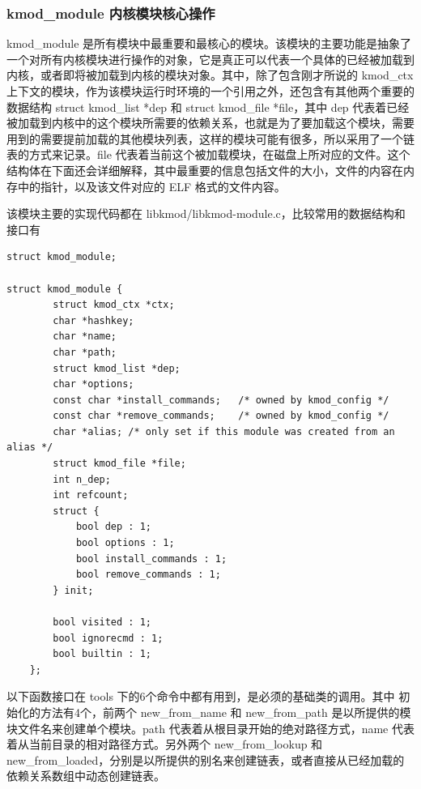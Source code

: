 \documentclass[11pt,a4paper]{article}
\begin{document}
\subsubsection{kmod\_module 内核模块核心操作}

kmod\_module
是所有模块中最重要和最核心的模块。该模块的主要功能是抽象了一个对所有内核模块进行操作的对象，它是真正可以代表一个具体的已经被加载到内核，或者即将被加载到内核的模块对象。其中，除了包含刚才所说的
kmod\_ctx
上下文的模块，作为该模块运行时环境的一个引用之外，还包含有其他两个重要的数据结构
struct kmod\_list *dep 和 struct kmod\_file *file，其中 dep
代表着已经被加载到内核中的这个模块所需要的依赖关系，也就是为了要加载这个模块，需要用到的需要提前加载的其他模块列表，这样的模块可能有很多，所以采用了一个链表的方式来记录。file
代表着当前这个被加载模块，在磁盘上所对应的文件。这个结构体在下面还会详细解释，其中最重要的信息包括文件的大小，文件的内容在内存中的指针，以及该文件对应的
ELF 格式的文件内容。

该模块主要的实现代码都在
libkmod/libkmod-module.c，比较常用的数据结构和接口有

{\begin{shaded}\begin{verbatim}
struct kmod_module;

struct kmod_module {
        struct kmod_ctx *ctx;
        char *hashkey;
        char *name;
        char *path;
        struct kmod_list *dep;
        char *options;
        const char *install_commands;   /* owned by kmod_config */
        const char *remove_commands;    /* owned by kmod_config */
        char *alias; /* only set if this module was created from an alias */
        struct kmod_file *file;
        int n_dep;
        int refcount;
        struct {
            bool dep : 1;
            bool options : 1;
            bool install_commands : 1;
            bool remove_commands : 1;
        } init;

        bool visited : 1;
        bool ignorecmd : 1;
        bool builtin : 1;
    };
\end{verbatim}\end{shaded}}
以下函数接口在 tools 下的6个命令中都有用到，是必须的基础类的调用。其中
初始化的方法有4个，前两个 new\_from\_name 和 new\_from\_path
是以所提供的模块文件名来创建单个模块。path
代表着从根目录开始的绝对路径方式，name
代表着从当前目录的相对路径方式。另外两个 new\_from\_lookup 和
new\_from\_loaded，分别是以所提供的别名来创建链表，或者直接从已经加载的依赖关系数组中动态创建链表。
\end{document}
